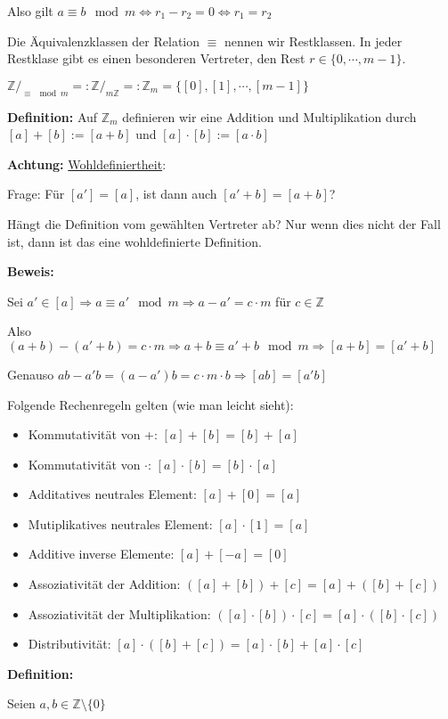 \documentclass[pdftex,12pt,a4paper,fleqn]{scrartcl}
\begin{document}
Also gilt $a \equiv b \mod m \Leftrightarrow r_1 -r_2 = 0 \Leftrightarrow r_1=r_2$

Die Äquivalenzklassen der Relation $\equiv$ nennen wir Restklassen. In jeder Restklase gibt es einen besonderen Vertreter, den Rest $r \in \{0,\cdots,m-1\}$.

$\mathbb{Z}/_{\equiv \mod m} =: \mathbb{Z}/_{m \mathbb{Z}} =: \mathbb{Z}_m = \{[0],[1],\cdots,[m-1]\}$

\textbf{Definition:} Auf $\mathbb{Z}_m$ definieren wir eine Addition und Multiplikation durch $[a] + [b] := [a+b]$ und $[a] \cdot [b] := [a \cdot b]$

\textbf{Achtung:} \underline{Wohldefiniertheit}:

Frage: Für $[a'] = [a]$, ist dann auch $[a'+b] = [a+b]$?

Hängt die Definition vom gewählten Vertreter ab? Nur wenn dies nicht der Fall ist, dann ist das eine wohldefinierte Definition.

\textbf{Beweis:}

Sei $a' \in [a] \Rightarrow a \equiv a' \mod m \Rightarrow a - a' = c \cdot m$ für $c \in \mathbb{Z}$

Also $(a+b) - (a'+b) = c \cdot m \Rightarrow a+b \equiv a'+b \mod m \Rightarrow [a+b] = [a'+b]$

Genauso $ab-a'b = (a-a')b = c \cdot m \cdot b \Rightarrow [ab]=[a'b]$

Folgende Rechenregeln gelten (wie man leicht sieht):

\begin{itemize}
	\item Kommutativität von +: $[a]+[b]=[b]+[a]$
	\item Kommutativität von $\cdot$: $[a]\cdot[b]=[b]\cdot[a]$
	\item Additatives neutrales Element: $[a]+[0]=[a]$
	\item Mutiplikatives neutrales Element: $[a]\cdot[1]=[a]$
	\item Additive inverse Elemente: $[a]+[-a]=[0]$
	\item Assoziativität der Addition: $([a]+[b])+[c]=[a]+([b]+[c])$
	\item Assoziativität der Multiplikation: $([a]\cdot[b])\cdot[c]=[a]\cdot([b]\cdot[c])$
	\item Distributivität: $[a] \cdot ([b]+[c])=[a]\cdot[b]+[a]\cdot[c]$
\end{itemize}

\textbf{Definition:}

Seien $a,b \in \mathbb{Z} \setminus \{0\}$
\end{document}
